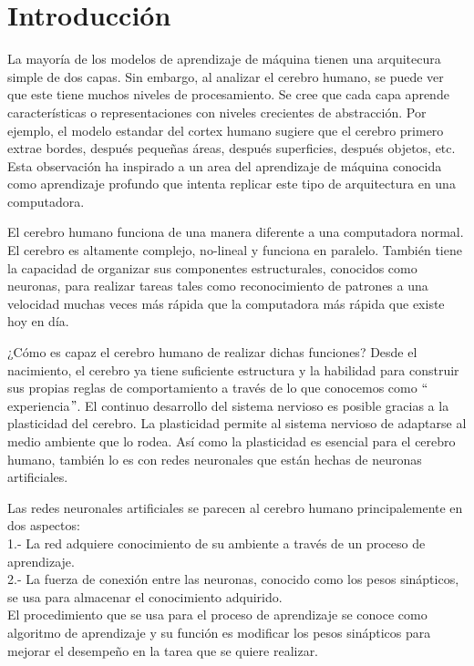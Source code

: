 \section{Introducción}
La mayoría de los modelos de aprendizaje de máquina tienen una arquitecura simple de dos capas. Sin embargo, al analizar el cerebro humano, se puede ver que este tiene muchos niveles de procesamiento. Se cree que cada capa aprende características o representaciones con niveles crecientes de abstracción. Por ejemplo, el modelo estandar del cortex humano sugiere que el cerebro primero extrae bordes, después pequeñas áreas, después superficies, después objetos, etc. Esta observación ha inspirado a un area del aprendizaje de máquina conocida como aprendizaje profundo que intenta replicar este tipo de arquitectura en una computadora.
\cite{Murphy:2012:MLP:2380985}

\vspace{1em}

El cerebro humano funciona de una manera diferente a una computadora normal. El cerebro es altamente complejo, no-lineal y funciona en paralelo. También tiene la capacidad de organizar sus componentes estructurales, conocidos como neuronas, para realizar tareas tales como reconocimiento de patrones a una velocidad muchas veces más rápida que la computadora más rápida que existe hoy en día.
\cite{Haykin:1998:NNC:521706}

\vspace{1em}

¿Cómo es capaz el cerebro humano de realizar dichas funciones? Desde el nacimiento, el cerebro ya tiene suficiente estructura y la habilidad para construir sus propias reglas de comportamiento a través de lo que conocemos como $``$experiencia$"$. El continuo desarrollo del sistema nervioso es posible gracias a la plasticidad del cerebro. La plasticidad permite al sistema nervioso de adaptarse al medio ambiente que lo rodea. Así como la plasticidad es esencial para el cerebro humano, también lo es con redes neuronales que están hechas de neuronas artificiales.
\cite{Haykin:1998:NNC:521706}

\vspace{1em}

Las redes neuronales artificiales se parecen al cerebro humano principalemente en dos aspectos: \\
1.- La red adquiere conocimiento de su ambiente a través de un proceso de aprendizaje.\\
2.- La fuerza de conexión entre las neuronas, conocido como los pesos sinápticos, se usa para almacenar el conocimiento adquirido. \\
El procedimiento que se usa para el proceso de aprendizaje se conoce como algoritmo de aprendizaje y su función es modificar los pesos sinápticos para mejorar el desempeño en la tarea que se quiere realizar. \cite{Haykin:1998:NNC:521706}

